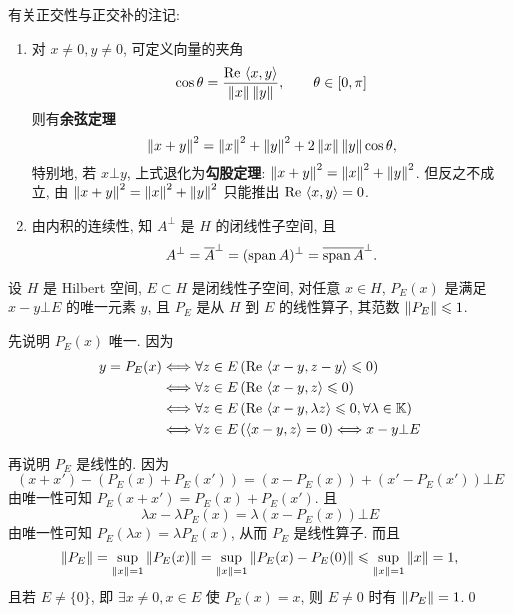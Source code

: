     \begin{Remark}\label{rmk:正交性与正交补}
        有关正交性与正交补的注记:
        \begin{enumerate}[(1)]
            \item 对 $ x\ne0, y\ne 0 $, 可定义向量的夹角
            \[
                \cos\theta=\frac{\mathrm{Re\,}\left\langle x, y \right\rangle}{\left\| x \right\|\left\| y \right\|},\qquad \theta\in[0, \pi]
            \]
            则有\textbf{余弦定理}
            \[
                \left\| x+y \right\|^{2}=\left\| x \right\|^{2}+\left\| y \right\|^{2}+2\left\| x \right\|\left\| y \right\|\cos\theta,
            \]
            特别地, 若 $ x\bot y $, 上式退化为\textbf{勾股定理}: $ \left\| x+y \right\|^{2}=\left\| x \right\|^{2}+\left\| y \right\|^{2} $. 但反之不成立, 由 $ \left\| x+y \right\|^{2}=\left\| x \right\|^{2}+\left\| y \right\|^{2} $ 只能推出 $ \mathrm{Re\,}\left\langle x, y \right\rangle= 0 $.
            \item 由内积的连续性, 知 $ A^{\bot} $ 是 $ H $ 的闭线性子空间, 且
            \[
                A^{\bot}=\overline{A}^{\bot}=(\operatorname{span} A)^{\bot}=\overline{\operatorname{span} A}^{\bot}.
            \]
        \end{enumerate}
    \end{Remark}

        \begin{Theorem}[投影线性算子]
             设 $ H $ 是 Hilbert 空间, $ E\subset H $ 是闭线性子空间,  对任意 $ x\in H $, $ P_{E}(x) $ 是满足 $ x- y\bot E $ 的唯一元素 $ y $, 且 $ P_{E} $ 是从 $ H $ 到 $ E $ 的线性算子, 其范数 $ \left\| P_{E} \right\|\leqslant1 $.
        \end{Theorem}

        \begin{Proof}
            先说明 $ P_{E}(x) $ 唯一. 因为
            \[
                \begin{aligned}
                    y=P_{E}(x) & \Longleftrightarrow \forall z\in E\,(\mathrm{Re\,}\left\langle x-y, z-y \right\rangle\leqslant0)\\
                    & \Longleftrightarrow \forall z\in E\,(\mathrm{Re\,}\left\langle x-y, z \right\rangle\leqslant0)\\
                    & \Longleftrightarrow \forall z\in E\,(\mathrm{Re\,}\left\langle x-y, \lambda z \right\rangle\leqslant0, \forall \lambda\in \mathbb{K})\\
                    & \Longleftrightarrow \forall z\in E\,(\left\langle x-y, z \right\rangle=0)\Longleftrightarrow x-y\bot E
                \end{aligned}
            \]

            再说明 $ P_{E} $ 是线性的. 因为
            \[
                (x+x')-(P_{E}(x)+P_{E}(x'))=(x-P_{E}(x))+(x'-P_{E}(x'))\bot E
            \]
            由唯一性可知 $ P_{E}(x+x')=P_{E}(x)+P_{E}(x') $. 且
            \[
                \lambda x-\lambda P_{E}(x)=\lambda(x-P_{E}(x))\bot E
            \]
            由唯一性可知 $ P_{E}(\lambda x)=\lambda P_{E}(x) $, 从而 $ P_{E} $ 是线性算子. 而且
            \[
                \left\| P_{E} \right\|=\sup_{\left\| x \right\|=1}\left\| P_{E}(x) \right\|=\sup_{\left\| x \right\|=1}\left\| P_{E}(x)-P_{E}(0) \right\|\leqslant\sup_{\left\| x \right\|=1}\left\| x \right\|=1,
            \]
            且若 $ E\ne \{ 0 \} $, 即 $ \exists x\ne 0, x\in E $ 使 $ P_{E}(x)=x $, 则 $ E\ne 0 $ 时有 $ \left\| P_{E} \right\|=1 $.\qed
        \end{Proof}

